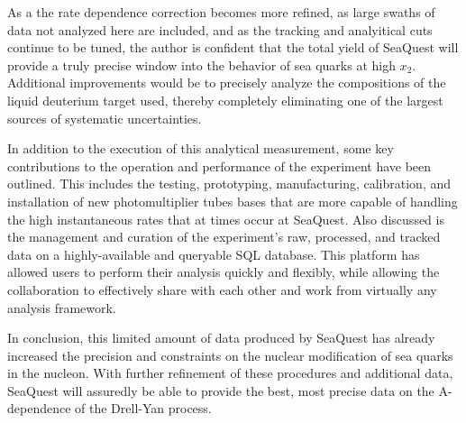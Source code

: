 As a the rate dependence correction becomes more refined, as large swaths of data not analyzed here are included, and as the tracking and analyitical cuts continue to be tuned, the author is confident that the total yield of SeaQuest will provide a truly precise window into the behavior of sea quarks at high $x_2$. Additional improvements would be to precisely analyze the compositions of the liquid deuterium target used, thereby completely eliminating one of the largest sources of systematic uncertainties.

In addition to the execution of this analytical measurement, some key contributions to the operation and performance of the experiment have been outlined. This includes the testing, prototyping, manufacturing, calibration, and installation of new photomultiplier tubes bases that are more capable of handling the high instantaneous rates that at times occur at SeaQuest. Also discussed is the management and curation of the experiment's raw, processed, and tracked data on a highly-available and queryable SQL database. This platform has allowed users to perform their analysis quickly and flexibly, while allowing the collaboration to effectively share with each other and work from virtually any analysis framework.

In conclusion, this limited amount of data produced by SeaQuest has already increased the precision and constraints on the nuclear modification of sea quarks in the nucleon. With further refinement of these procedures and additional data, SeaQuest will assuredly be able to provide the best, most precise data on the A-dependence of the Drell-Yan process.
